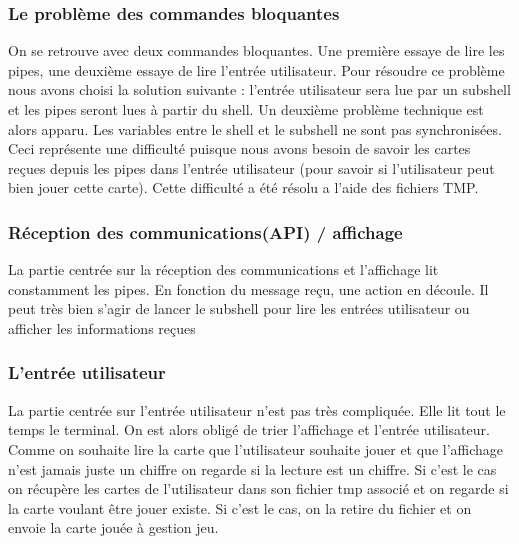\documentclass{article}
\begin{document}
\subsubsection{Le problème des commandes bloquantes}
On se retrouve avec deux commandes bloquantes. Une première essaye de lire les pipes, une deuxième essaye de lire l'entrée utilisateur. Pour résoudre ce problème nous avons choisi la solution suivante : l'entrée utilisateur sera lue par un subshell et les pipes seront lues à partir du shell. Un deuxième problème technique est alors apparu. Les variables entre le shell et le subshell ne sont pas synchronisées. Ceci représente une difficulté puisque nous avons besoin de savoir les cartes reçues depuis les pipes dans l'entrée utilisateur (pour savoir si l'utilisateur peut bien jouer cette carte). Cette difficulté a été résolu a l'aide des fichiers TMP.

\subsubsection{Réception des communications(API) / affichage}
La partie centrée sur la réception des communications et l'affichage lit constamment les pipes. En fonction du message reçu, une action en découle. Il peut très bien s'agir de lancer le subshell pour lire les entrées utilisateur ou afficher les informations reçues

\subsubsection{L'entrée utilisateur}
La partie centrée sur l'entrée utilisateur n'est pas très compliquée. Elle lit tout le temps le terminal. On est alors obligé de trier l'affichage et l'entrée utilisateur. Comme on souhaite lire la carte que l'utilisateur souhaite jouer et que l'affichage n'est jamais juste un chiffre on regarde si la lecture est un chiffre. Si c'est le cas on récupère les cartes de l'utilisateur dans son fichier tmp associé et on regarde si la carte voulant être jouer existe. Si c'est le cas, on la retire du fichier et on envoie la carte jouée à gestion jeu. 
\end{document}
